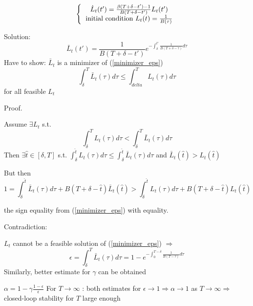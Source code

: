 \begin{equation*}
\left \{
  \begin{tabular}{c}
  $\dot L_t(t') = \frac{\beta(T+\delta - t') -1}{B(T+\delta - t')}L_t(t')$ \\
 initial condition $L_t(t)=\frac{1}{B(\tau)}$
  \end{tabular}
\right .
\end{equation*}

Solution:
\begin{equation*}
\bar L_t(t') = \frac{1}{B(T+\delta-t')}e^{-\int_{\delta}^{t'}\frac{1}{B(T+\delta-\tau)}d\tau}
\end{equation*}
Have to show: $\bar L_t$ is a minimizer of (\ref{minimizer_eps})
\begin{equation*}
\int_{\delta}^{T} \bar L_t(\tau)d\tau \leq \int_{delta}^{T} L_t(\tau)d\tau 
\end{equation*}
for all feasible $L_t$

Proof.

Assume $\exists L_t$ s.t. 
\begin{equation*}
\int_{\delta}^{T}L_t(\tau)d\tau < \int_{\delta}^{T}\bar L_t(\tau)d\tau
\end{equation*}
Then $\exists \hat t \in [\delta, T]$ s.t. $\int_{\delta}^{\hat t}L_t(\tau)d\tau \leq \int_{\delta}^{\hat t}\bar L_t(\tau)d\tau$ and $\bar L_t(\hat t) > L_t(\hat t)$

But then 
\begin{equation}
1 = \int_{\delta}^{\hat t} \bar L_t(\tau)d\tau + B(T+\delta-\hat t)\bar L_t(\hat t) > \int_{\delta}^{\hat t}L_t(\tau)d\tau + B(T+\delta-\hat t) L_t(\hat t)
\end{equation}

the sign equality from (\ref{minimizer_eps}) with equality.

Contradiction:

$L_t$ cannot be a feasible solution of (\ref{minimizer_eps}) 
$\Rightarrow$ 
\begin{equation*}
\epsilon = \int_{\delta}^{T}\bar L_t(\tau)d\tau = 1 - e^{-\int_0^{T-\delta}\frac{1}{B(T-\tau)}d\tau}
\end{equation*}
Similarly, better estimate for $\gamma$ can be obtained

$\alpha = 1 - \gamma\frac{1-\epsilon}{\epsilon}$
For $T \to \infty$ : both estimates for $\epsilon \to 1 \Rightarrow \alpha \to 1$ as $T \to \infty \Rightarrow$ closed-loop stability for $T$ large enough 
